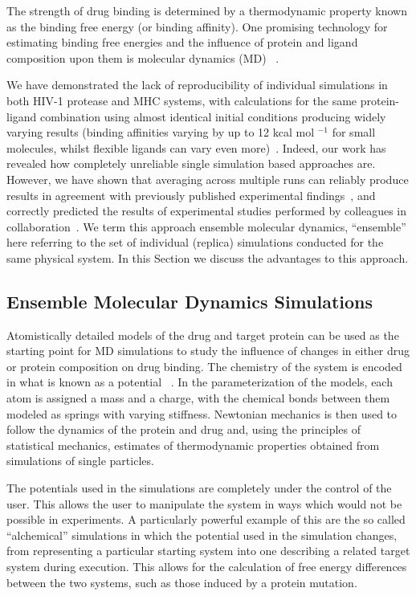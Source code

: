 The strength of drug binding is determined by a thermodynamic property known
as the binding free energy (or binding affinity). 
One promising technology for estimating binding free energies and the influence 
of protein and ligand composition upon them is molecular dynamics (MD)
~\cite{Karplus2005}.

We have demonstrated the lack of reproducibility of individual simulations in both 
HIV-1 protease and MHC systems, with calculations for the same protein-ligand combination
using almost identical initial conditions producing widely varying results (binding affinities 
varying by up to 12 kcal mol $^{-1}$ for small molecules, whilst flexible ligands can vary even
more)~\cite{Wan2015, Sadiq2010, Wright2014}. 
Indeed, our work has revealed how completely unreliable single simulation based 
approaches are.
However, we have shown that averaging across multiple runs can reliably produce results in
agreement with previously published experimental findings~\cite{Sadiq2010,
Wan2011, Wright2014, Bhati2017, Wan2017brd4, Wan2017trk}, and correctly
predicted the results of experimental studies performed by colleagues in
collaboration~\cite{Bunney2015}. 
We term this approach ensemble molecular dynamics, ``ensemble'' here referring to 
the set of individual (replica) simulations conducted for the same physical system. 
In this Section we discuss the advantages to this approach.

\subsection{Ensemble Molecular Dynamics Simulations}

Atomistically detailed models of the drug and target protein can be used as the
starting point for MD simulations to study the influence of changes in 
either drug or protein composition on drug binding. 
The chemistry of the system is encoded in what is known as a potential
~\cite{Karplus2002}. 
In the parameterization of the models, each atom is assigned a mass and a charge,
with the chemical bonds between them modeled as springs with varying
stiffness.
Newtonian mechanics is then used to follow the dynamics of the protein and drug and, 
using the principles of statistical mechanics, estimates of thermodynamic properties 
obtained from simulations of single particles.

The potentials used in the simulations are completely under the control of
the user. 
This allows the user to manipulate the system in ways which would
not be possible in experiments. 
A particularly powerful example of this are
the so called ``alchemical'' simulations in which the potential used in the
simulation changes, from representing a particular starting system into one 
describing a related target system during execution. 
This allows for the calculation of free energy differences between the two 
systems, such as those induced by a protein mutation.

